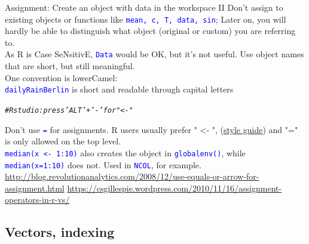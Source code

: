 \documentclass[xcolor=table,           xcolor=dvipsnames]{beamer}\usepackage[]{graphicx}\usepackage[]{color}
\makeatletter
\newcommand{\hlcom}[1]{\textcolor[rgb]{0,0.392,0}{\textit{#1}}}
\newenvironment{kframe}{%
 \def\at@end@of@kframe{}%
 \ifinner\ifhmode%
  \def\at@end@of@kframe{\end{minipage}}%
  \begin{minipage}{\columnwidth}%
 \fi\fi%
 \def\FrameCommand##1{\hskip\@totalleftmargin \hskip-\fboxsep
 \colorbox{shadecolor}{##1}\hskip-\fboxsep
     \hskip-\linewidth \hskip-\@totalleftmargin \hskip\columnwidth}%
 \MakeFramed {\advance\hsize-\width
   \@totalleftmargin\z@ \linewidth\hsize
   \@setminipage}}%
 {\par\unskip\endMakeFramed%
 \at@end@of@kframe}
\newenvironment{knitrout}{}{} %
\newcommand{\rcode}[1]{\texttt{\textcolor{Blue}{#1}}} %
\makeatother
\begin{document}
\begin{frame}[fragile]{Assignment:  Create an object with data in the workspace II}
Don't assign to existing objects or functions like \rcode{mean, c, T, data, sin}; \onslide<+-> Later on, you will hardly be able to distinguish what object (original or custom) you are referring to.\\ %
\onslide<+->
As R is Case SeNsitivE, \rcode{Data} would be OK, but it's not useful. Use object names that are short, but still meaningful.\\
\onslide<+->
One convention is lowerCamel:\\
\rcode{dailyRainBerlin} is short and readable through capital letters
\onslide<+->
\begin{knitrout}
\color{fgcolor}\begin{kframe}
\begin{alltt}
\hlcom{# Rstudio: press 'ALT' + '-'  for   " <- "}
\end{alltt}
\end{kframe}
\end{knitrout}
\onslide<+->
Don't use \rcode{=} for assignments. R users usually prefer " <- ", (\href{http://google-styleguide.googlecode.com/svn/trunk/Rguide.xml}{style guide}) and "=" is only allowed on the top level.\\ \onslide<+->
\rcode{median(x <- 1:10)} also creates the object in \rcode{globalenv()}, while \rcode{median(x=1:10)} does not.
Used in \rcode{NCOL}, for example.\\ 
\onslide<+->
\footnotesize{
\href{http://blog.revolutionanalytics.com/2008/12/use-equals-or-arrow-for-assignment.html}{http://blog.revolutionanalytics.com/2008/12/use-equals-or-arrow-for-assignment.html}
\href{https://csgillespie.wordpress.com/2010/11/16/assignment-operators-in-r-vs/}{https://csgillespie.wordpress.com/2010/11/16/assignment-operators-in-r-vs/}}
\end{frame}

\subsection{Vectors, indexing}
\end{document}

